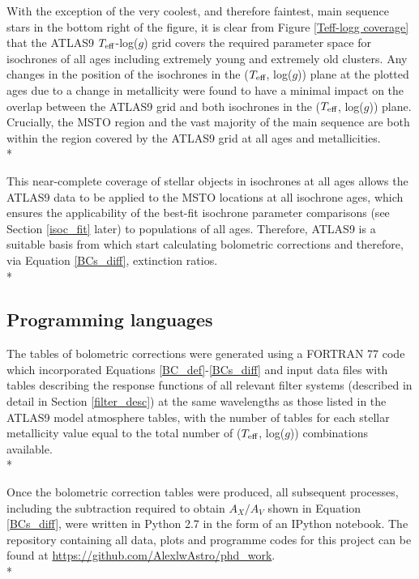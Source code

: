 \documentclass[12pt, a4paper]{report}
\begin{document}
With the exception of the very coolest, and therefore faintest, main sequence stars in the bottom right of the figure, it is clear from Figure \ref{Teff-logg coverage} that the ATLAS9 $T_{\textnormal{eff}}$-log($g$) grid covers the required parameter space for isochrones of all ages including extremely young and extremely old clusters. Any changes in the position of the isochrones in the ($T_{\textnormal{eff}}$, log($g$)) plane at the plotted ages due to a change in metallicity were found to have a minimal impact on the overlap between the ATLAS9 grid and both isochrones in the ($T_{\textnormal{eff}}$, log($g$)) plane. Crucially, the MSTO region and the vast majority of the main sequence are both within the region covered by the ATLAS9 grid at all ages and metallicities. \\*

This near-complete coverage of stellar objects in isochrones at all ages allows the ATLAS9 data to be applied to the MSTO locations at all isochrone ages, which ensures the applicability of the best-fit isochrone parameter comparisons (see Section \ref{isoc_fit} later) to populations of all ages. Therefore, ATLAS9 is a suitable basis from which start calculating bolometric corrections and therefore, via Equation \ref{BCs_diff}, extinction ratios. \\*



\subsection{Programming languages}
The tables of bolometric corrections were generated using a FORTRAN 77 code which incorporated Equations \ref{BC_def}-\ref{BCs_diff} and input data files with tables describing the response functions of all relevant filter systems (described in detail in Section \ref{filter_desc}) at the same wavelengths as those listed in the ATLAS9 model atmosphere tables, with the number of tables for each stellar metallicity value equal to the total number of ($T_{\textnormal{eff}}$, log($g$)) combinations available.\\*

Once the bolometric correction tables were produced, all subsequent processes, including the subtraction required to obtain $A_{X}/A_{V}$ shown in Equation \ref{BCs_diff}, were written in Python 2.7 in the form of an IPython notebook. The repository containing all data, plots and programme codes for this project can be found at \protect\url{https://github.com/AlexlwAstro/phd_work}.\\*
\end{document}
